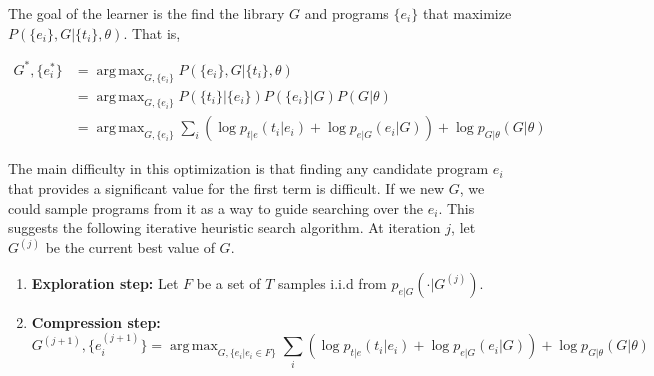 \documentclass{article}
\DeclareMathOperator*{\argmax}{arg\,max}
\begin{document}
The goal of the learner is the find the library $G$ and programs
$\{e_i\}$ that maximize $P(\{e_i\}, G | \{t_i\}, \theta)$. That is, 

\begin{align}
G^*, \{e^*_i\} &= \argmax_{G, \{e_i\} }
   P(\{e_i\}, G | \{t_i\}, \theta)\\
&= \argmax_{G, \{e_i\} } P(\{t_i\} | \{e_i\})
  P(\{e_i\} | G) P(G | \theta)\\
&= \argmax_{G, \{e_i\} }
  \sum_i \left( 
  \log{p_{t|e}(t_i|e_i)}+ 
  \log{p_{e|G}(e_i|G)}
  \right ) +
  \log{p_{G|\theta}(G|\theta)}
\label{eq:objective}
\end{align}

The main difficulty in this optimization is that finding any candidate
program $e_i$ that provides a significant value for the first term is
difficult. If we new $G$, we could sample programs from it as a way to
guide searching over the $e_i$. This suggests the following iterative
heuristic search algorithm. At iteration $j$, let $G^{(j)}$ be the
current best value of $G$. 

\begin{enumerate}
\item \textbf{Exploration step: } Let $F$ be a set of $T$ samples
  i.i.d from $p_{e|G}(\cdot | G^{(j)})$.
\item \textbf{Compression step: } 
$$G^{(j+1)}, \{e^{(j+1)}_i\} = 
\argmax_{G, \{e_i | e_i \in F \}}
\sum_i \left( 
\log{p_{t|e}(t_i|e_i)}+ 
\log{p_{e|G}(e_i|G)}
\right ) +
\log{p_{G|\theta}(G|\theta)}
$$
\end{enumerate}












 
\end{document}
